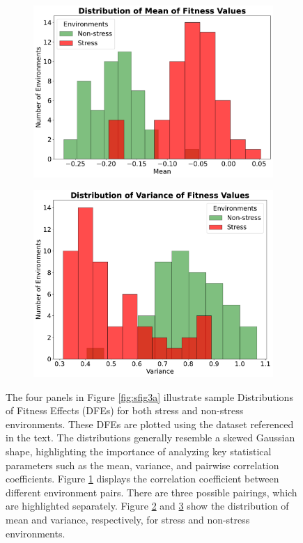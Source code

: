 \documentclass[11pt]{article}
\begin{document}
\begin{figure}
\begin{subfigure}{.5\textwidth}
  \caption{}
  \label{fig:sfig3b}
\end{subfigure} \\
\begin{subfigure}{.5\textwidth}
  \includegraphics[width=1\linewidth]{exp_mean_samples.pdf}
  \caption{}
  \label{fig:sfig3c}
\end{subfigure}%
\begin{subfigure}{.5\textwidth}
  \includegraphics[width=0.92\linewidth]{exp_std_samples.pdf}
  \caption{}
  \label{fig:sfig3d}
\end{subfigure}
\caption{The four panels in Figure \ref{fig:sfig3a} illustrate sample Distributions of Fitness Effects (DFEs) for both stress and non-stress environments. These DFEs are plotted using the dataset referenced in the text. The distributions generally resemble a skewed Gaussian shape, highlighting the importance of analyzing key statistical parameters such as the mean, variance, and pairwise correlation coefficients. Figure \ref{fig:sfig3b} displays the correlation coefficient between different environment pairs. There are three possible pairings, which are highlighted separately. Figure \ref{fig:sfig3c} and \ref{fig:sfig3d} show the distribution of mean and variance, respectively, for stress and non-stress environments.  }
\label{fig:fig3}
\end{figure}
\end{document}
